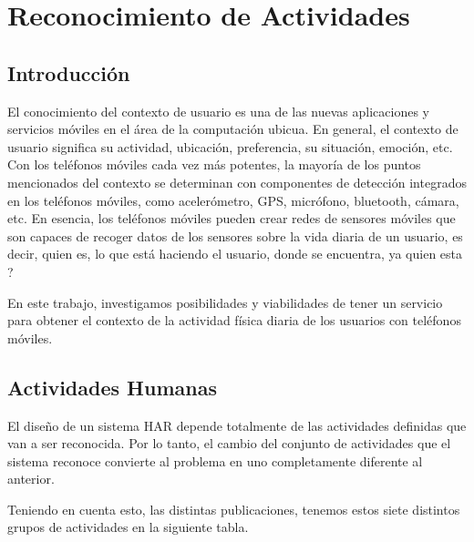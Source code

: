 
\chapter{Reconocimiento de Actividades}
\label{chap2:Reconocimiento de Actividades}


\section{Introducción}
\label{sec21:introduccion}
El conocimiento del contexto de usuario es una de las nuevas aplicaciones y servicios móviles en el área de la computación ubicua.
En general, el contexto de usuario significa su actividad, ubicación, preferencia, su situación, emoción, etc. Con los teléfonos móviles cada vez más potentes, la mayoría de los puntos mencionados del contexto se determinan con componentes de detección integrados en los teléfonos móviles, como acelerómetro, GPS, micrófono, bluetooth, cámara, etc. En esencia, los teléfonos móviles pueden crear redes de sensores móviles que son capaces de recoger datos de los sensores sobre la vida diaria de un usuario, es decir, quien es, lo que está haciendo el usuario, donde se encuentra, ya quien esta ? 

En este trabajo, investigamos posibilidades y viabilidades de tener un servicio para obtener el contexto de la actividad física diaria de los usuarios con teléfonos móviles.

\section{Actividades Humanas}
\label{sec22:actividades-humanas}
El diseño de un sistema HAR depende totalmente de las actividades definidas que van a ser reconocida. Por lo tanto, el cambio del conjunto de actividades que el sistema reconoce convierte al problema en uno completamente diferente al anterior.

Teniendo en cuenta esto, las distintas publicaciones, tenemos estos siete distintos grupos de actividades en la siguiente tabla.

\newcommand{\rr}{\raggedright}
\newcommand{\tn}{\tabularnewline}

